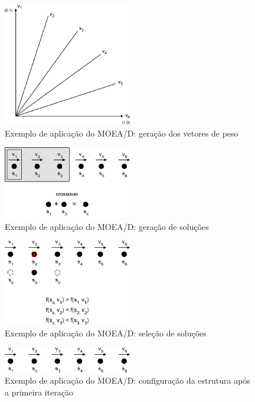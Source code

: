 \begin{figure}[!htbp]
	\centering
	\includegraphics[width=0.5\textwidth]{cap_otimizacao-multi/figs/moead-ex1}
	\caption{\label{fig_moead_ex1}Exemplo de aplicação do MOEA/D: geração dos vetores de peso}
\end{figure}

\begin{figure}[!htbp]
	\centering
	\includegraphics[width=0.5\textwidth]{cap_otimizacao-multi/figs/moead-ex2}
	\caption{\label{fig_moead_ex2}Exemplo de aplicação do MOEA/D: geração de soluções}
\end{figure}

\begin{figure}[!htbp]
	\centering
	\includegraphics[width=0.5\textwidth]{cap_otimizacao-multi/figs/moead-ex3}
	\caption{\label{fig_moead_ex3}Exemplo de aplicação do MOEA/D: seleção de soluções}
\end{figure}

\begin{figure}[!htbp]
	\centering
	\includegraphics[width=0.5\textwidth]{cap_otimizacao-multi/figs/moead-ex4}
	\caption{\label{fig_moead_ex4}Exemplo de aplicação do MOEA/D: configuração da estrutura após a primeira iteração}
\end{figure}

